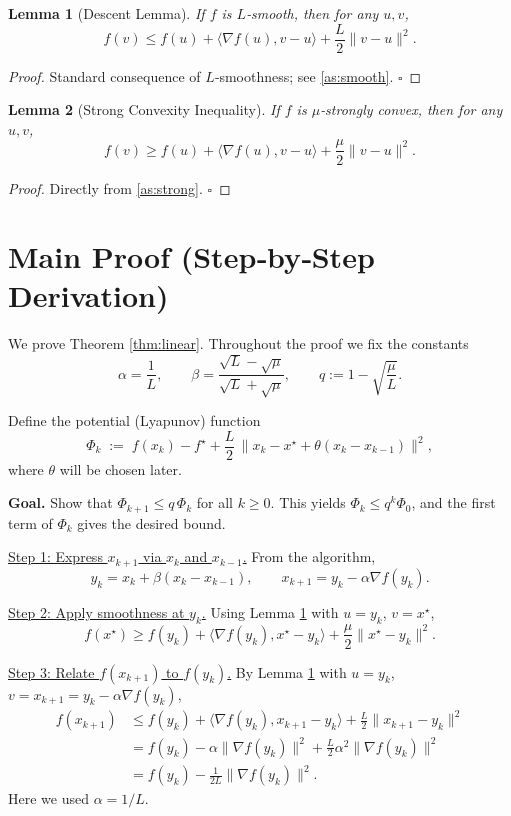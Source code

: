 \documentclass{article}
\newtheorem{lemma}{Lemma}[section]
\begin{document}
\begin{lemma}[Descent Lemma]\label{lem:descent}
If $f$ is $L$‑smooth, then for any $u,v$,
\[
f(v) \le f(u) + \langle\nabla f(u),v-u\rangle + \frac{L}{2}\|v-u\|^2.
\tag{L2}
\]
\end{lemma}
\begin{proof}
Standard consequence of $L$‑smoothness; see \eqref{as:smooth}. \hfill $\square$
\end{proof}

\begin{lemma}[Strong Convexity Inequality]\label{lem:strong}
If $f$ is $\mu$‑strongly convex, then for any $u,v$,
\[
f(v) \ge f(u) + \langle\nabla f(u),v-u\rangle + \frac{\mu}{2}\|v-u\|^2.
\tag{L3}
\]
\end{lemma}
\begin{proof}
Directly from \eqref{as:strong}. \hfill $\square$
\end{proof}

\section*{Main Proof (Step‑by‑Step Derivation)}
We prove Theorem \ref{thm:linear}. Throughout the proof we fix the constants
\[
\alpha=\frac1L,\qquad 
\beta = \frac{\sqrt{L}-\sqrt{\mu}}{\sqrt{L}+\sqrt{\mu}},\qquad 
q:=1-\sqrt{\frac{\mu}{L}}.
\]

Define the potential (Lyapunov) function
\[
\Phi_k \;:=\; f(x_k)-f^\star + \frac{L}{2}\,\|x_k - x^\star + \theta (x_k-x_{k-1})\|^2,
\tag{P1}
\]
where $\theta$ will be chosen later.

\noindent\textbf{Goal.} Show that $\Phi_{k+1}\le q\,\Phi_k$ for all $k\ge0$. This yields $\Phi_k\le q^k\Phi_0$, and the first term of $\Phi_k$ gives the desired bound.

\bigskip
\noindent\underline{Step 1: Express $x_{k+1}$ via $x_k$ and $x_{k-1}$.}  
From the algorithm,
\[
y_k = x_k + \beta (x_k-x_{k-1}),\qquad
x_{k+1}= y_k - \alpha \nabla f(y_k).
\tag{S1}
\]

\noindent\underline{Step 2: Apply smoothness at $y_k$.}  
Using Lemma \ref{lem:descent} with $u=y_k$, $v=x^\star$,
\[
f(x^\star) \ge f(y_k) + \langle\nabla f(y_k),x^\star-y_k\rangle + \frac{\mu}{2}\|x^\star-y_k\|^2.
\tag{S2}
\]

\noindent\underline{Step 3: Relate $f(x_{k+1})$ to $f(y_k)$.}  
By Lemma \ref{lem:descent} with $u=y_k$, $v=x_{k+1}=y_k-\alpha\nabla f(y_k)$,
\[
\begin{aligned}
f(x_{k+1})
&\le f(y_k) + \langle\nabla f(y_k),x_{k+1}-y_k\rangle
      +\frac{L}{2}\|x_{k+1}-y_k\|^2\\
&= f(y_k) -\alpha\|\nabla f(y_k)\|^2
      +\frac{L}{2}\alpha^2\|\nabla f(y_k)\|^2\\
&= f(y_k) -\frac{1}{2L}\|\nabla f(y_k)\|^2 .
\end{aligned}
\tag{S3}
\]
Here we used $\alpha=1/L$.
\end{document}
